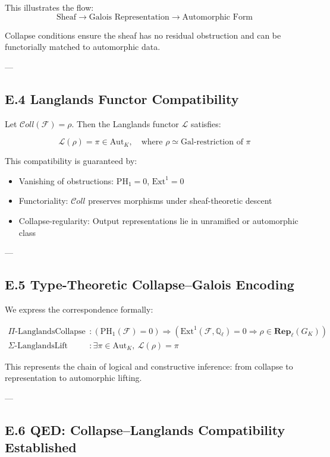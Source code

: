 \documentclass[11pt]{article}
\begin{document}
This illustrates the flow:
\[
\text{Sheaf} \rightarrow \text{Galois Representation} \rightarrow \text{Automorphic Form}
\]

Collapse conditions ensure the sheaf has no residual obstruction and can be functorially matched to automorphic data.

---

\subsection*{E.4 Langlands Functor Compatibility}

Let \( \mathcal{C}oll(\mathcal{F}) = \rho \). Then the Langlands functor \( \mathcal{L} \) satisfies:

\[
\mathcal{L}(\rho) = \pi \in \text{Aut}_K, \quad \text{where } \rho \simeq \text{Gal-restriction of } \pi
\]

This compatibility is guaranteed by:
\begin{itemize}
    \item Vanishing of obstructions: \( \mathrm{PH}_1 = 0 \), \( \mathrm{Ext}^1 = 0 \)
    \item Functoriality: \( \mathcal{C}oll \) preserves morphisms under sheaf-theoretic descent
    \item Collapse-regularity: Output representations lie in unramified or automorphic class
\end{itemize}

---

\subsection*{E.5 Type-Theoretic Collapse–Galois Encoding}

We express the correspondence formally:

\begin{align*}
\Pi\text{-LanglandsCollapse} &: \left( \mathrm{PH}_1(\mathcal{F}) = 0 \right) \Rightarrow \left( \mathrm{Ext}^1(\mathcal{F}, \mathbb{Q}_\ell) = 0 \Rightarrow \rho \in \mathbf{Rep}_{\ell}(G_K) \right) \\
\Sigma\text{-LanglandsLift} &: \exists \pi \in \text{Aut}_K,\ \mathcal{L}(\rho) = \pi
\end{align*}

This represents the chain of logical and constructive inference: from collapse to representation to automorphic lifting.

---

\subsection*{E.6 QED: Collapse–Langlands Compatibility Established}
\end{document}

